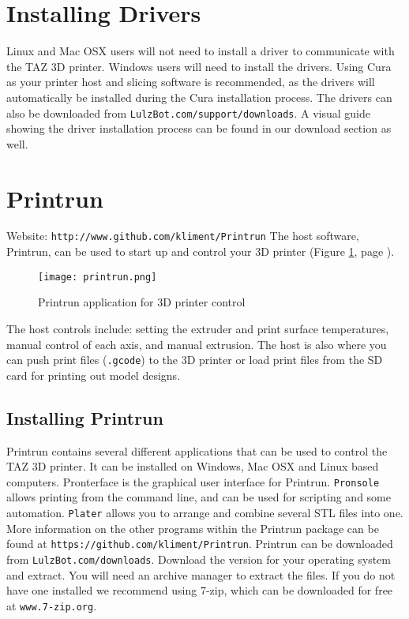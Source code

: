\section{Installing Drivers}
Linux and Mac OSX users will not need to install a driver to communicate with the TAZ 3D printer. Windows users will need to install the drivers. Using Cura as your printer host and slicing software is recommended, as the drivers will automatically be installed during the Cura installation process. The drivers can also be downloaded from \texttt{LulzBot.com/support/downloads}. A visual guide showing the driver installation process can be found in our download section as well.


   


\newpage
\section{Printrun}
\label{Printrun}
Website: \texttt{http://www.github.com/kliment/Printrun}
The host software, Printrun, can be used to start up and control your 3D printer (Figure \ref{fig:Printrun}, page \pageref{fig:Printrun}).
\begin{figure}[hbt]
\centering
\texttt{[image: printrun.png]}
\caption{Printrun application for 3D printer control}
\label{fig:Printrun}
\end{figure}
The host controls include: setting the extruder and print surface temperatures, manual control of each axis, and manual extrusion. The host is also where you can push print files (\texttt{.gcode}) to the 3D printer or load print files from the SD card for printing out model designs.

\subsection{Installing Printrun}
Printrun contains several different applications that can be used to control the TAZ 3D printer. It can be installed on Windows, Mac OSX and Linux based computers. Pronterface is the graphical user interface for Printrun. \texttt{Pronsole} allows printing from the command line, and can be used for scripting and some automation. \texttt{Plater} allows you to arrange and combine several STL files into one. More information on the other programs within the Printrun package can be found at \texttt{https://github.com/kliment/Printrun}. Printrun can be downloaded from \texttt{LulzBot.com/downloads}. Download the version for your operating system and extract. You will need an archive manager to extract the files. If you do not have one installed we recommend using 7-zip, which can be downloaded for free at \texttt{www.7-zip.org}.

